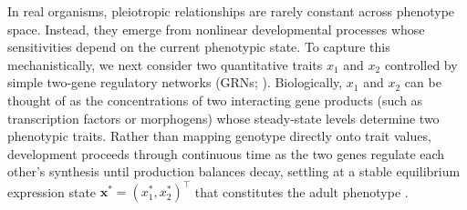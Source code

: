 In real organisms, pleiotropic relationships are rarely constant across phenotype space.
Instead, they emerge from nonlinear developmental processes whose sensitivities depend on the current phenotypic state.
To capture this mechanistically, we next consider two quantitative traits $x_1$ and $x_2$ controlled by simple two-gene regulatory networks (GRNs; \cite{gjuvsland2007statistical, hether2014genetic}).
Biologically, $x_1$ and $x_2$ can be thought of as the concentrations of two interacting gene products (such as transcription factors or morphogens) whose steady-state levels determine two phenotypic traits.
Rather than mapping genotype directly onto trait values, development proceeds through continuous time as the two genes regulate each other's synthesis until production balances decay, settling at a stable equilibrium expression state $\mathbf{x}^* = (x_1^*, x_2^*)^\top$ that constitutes the adult phenotype \parencite{lewontin1983organism, alberch1991genes, milocco2024utilizing}.


